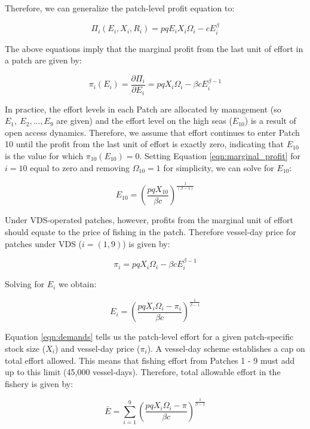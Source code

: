 \documentclass[12pt]{article}
\begin{document}
Therefore, we can generalize the patch-level profit equation to:

$$
\Pi_i(E_i,X_i, R_i) = pqE_iX_i\Omega_i-cE_i^\beta
$$

\noindent The above equations imply that the marginal profit from the last unit of effort in a patch are given by:

\begin{equation}
\pi_i(E_i) = \frac{\partial \Pi_i}{\partial E_i} = pqX_i\Omega_i - \beta cE_i^{\beta-1}
\label{eqn:marginal_profit}
\end{equation}

In practice, the effort levels in each Patch are allocated by management (so $E_{1},\ E_{2},...,E_{9}$ are given) and the effort level on the high seas ($E_{10}$) is a result of open access dynamics. Therefore, we assume that effort continues to enter Patch 10 until the profit from the last unit of effort is exactly zero, indicating that $E_{10}$ is the value for which $\pi_{10}(E_{10})  = 0$. Setting Equation \ref{eqn:marginal_profit} for $i = 10$ equal to zero and removing $\Omega_{10} = 1$ for simplicity, we can solve for $E_{10}$:

\begin{equation}
E_{10} = \left(\frac{pqX_{10}}{\beta c}\right)^{\frac{1}{(\beta - 1)}}
\label{eqn:effort_hs}
\end{equation}

Under VDS-operated patches, however, profits from the marginal unit of effort should equate to the price of fishing in the patch. Therefore vessel-day price for patches under VDS ($i = (1, 9)$) is  given by:

$$
\pi_i = pqX_i\Omega_i - \beta c E_i ^{\beta - 1}
$$

\noindent Solving for $E_i$ we obtain:

\begin{equation}
E_i = \left(\frac{pqX_i\Omega_i - \pi_i}{\beta c }\right) ^ {\frac{1}{\beta - 1}}
\label{eqn:demands}
\end{equation}

Equation \ref{eqn:demands} tells us the patch-level effort for a given patch-specific stock size ($X_i$) and vessel-day price ($\pi_i$). A vessel-day scheme establishes a cap on total effort allowed. This means that fishing effort from Patches 1 - 9 must add up to this limit (45,000 vessel-days). Therefore, total allowable effort in the fishery is given by:

\begin{equation}
\bar{E} = \sum_{i = 1}^9\left(\frac{pqX_i\Omega_i - \pi}{\beta c }\right) ^ {\frac{1}{\beta - 1}}
\label{eqn:Ebar}
\end{equation}
\end{document}
